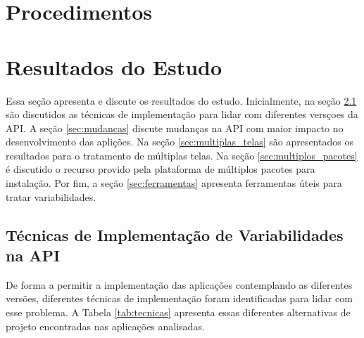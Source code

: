 \section{Procedimentos}
\label{sec:procedimentos}



\section{Resultados do Estudo}
\label{sec:resultados}

Essa seção apresenta e discute os resultados do estudo. Inicialmente, na seção 
\ref{sec:tecnicas} são discutidos as técnicas de implementação para lidar com
diferentes versçoes da API. A seção \ref{sec:mudancas} discute mudanças na API
com maior impacto no desenvolvimento das aplições.
Na seção \ref{sec:multiplas_telas} são apresentados os
resultados para o tratamento de múltiplas telas. Na seção \ref{sec:multiplos_pacotes}
é discutido o recurso provido pela plataforma de múltiplos pacotes para instalação.
Por fim, a seção \ref{sec:ferramentas} apresenta ferramentas úteis para tratar variabilidades. 

\subsection{Técnicas de Implementação de Variabilidades na API}
\label{sec:tecnicas}

De forma a permitir a implementação das aplicações contemplando as diferentes versões,
diferentes técnicas de implementação foram identificadas para lidar com esse problema.
A Tabela \ref{tab:tecnicas} apresenta essas diferentes alternativas de projeto
encontradas nas aplicações analisadas.

